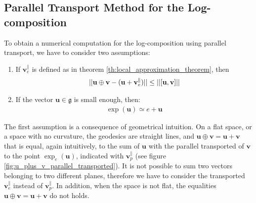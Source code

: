 \subsection{Parallel Transport Method for the Log-composition}
To obtain a numerical computation for the log-composition using parallel transport, we have to consider two assumptions: 
\begin{enumerate}
	\item If $\mathbf{v}_{e}^{\parallel} $ is defined as in theorem \ref{th:local_approximation_theorem}, then
	\begin{align*}
	\vert\lvert 
		\mathbf{u}\oplus \mathbf{v}  
		-
		(
		\mathbf{u} + \mathbf{v}_{e}^{\parallel} 
		)
	 \rvert\vert 
	\leq 
	\vert\lvert 
		[\mathbf{u}, \mathbf{v}]
		 \rvert\vert
	\end{align*}
	\item If the vector $\mathbf{u}\in\mathfrak{g}$ is small enough, then:
		\begin{align*}
		\exp(\mathbf{u}) \simeq e + \mathbf{u}
		\end{align*}
\end{enumerate}
The first assumption is a consequence of geometrical intuition. On a flat space, or a space with no curvature, the geodesics are straight lines, and $\mathbf{u}\oplus \mathbf{v} = \mathbf{u} + \mathbf{v} $ that is equal, again intuitively, to the sum of $\mathbf{u}$ with the parallel transported of $\mathbf{v}$ to the point $\exp_{e}(\mathbf{u})$, indicated with $\mathbf{v}_{p}^{\parallel} $ (see figure \ref{fig:u_plus_v_parallel_transported}). It is not possible to sum two vectors belonging to two different planes, therefore we have to consider the transported $\mathbf{v}_{e}^{\parallel} $ instead of $\mathbf{v}_{p}^{\parallel} $. In addition, when the space is not flat, the equalities $\mathbf{u}\oplus \mathbf{v} = \mathbf{u} + \mathbf{v} $ do not holds.

